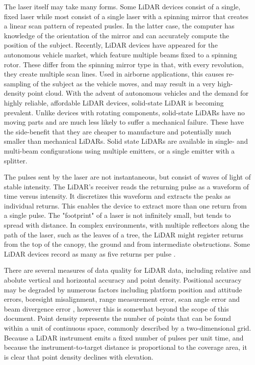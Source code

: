 \documentclass[10pt,a4paper]{report}
\begin{document}
The laser itself may take many forms. Some LiDAR devices consist of a single, fixed laser while most consist of a single laser with a spinning mirror that creates a linear scan pattern of repeated pusles. In the latter case, the computer has knowledge of the orientation of the mirror and can accurately compute the position of the subject. Recently, LiDAR devices have appeared for the autonomous vehicle market, which feature multiple beams fixed to a spinning rotor. These differ from the spinning mirror type in that, with every revolution, they create multiple scan lines. Used in airborne applications, this causes re-sampling of the subject as the vehicle moves, and may result in a very high-density point cloud. With the advent of autonomous vehicles and the demand for highly reliable, affordable LiDAR devices, solid-state LiDAR is becoming prevalent. Unlike devices with rotating components, solid-state LiDARs have no moving parts and are much less likely to suffer a mechanical failure. These have the side-benefit that they are cheaper to manufacture and potentially much smaller than mechanical LiDARs. Solid state LiDARs are available in single- and multi-beam configurations using multiple emitters, or a single emitter with a splitter.

The pulses sent by the laser are not instantaneous, but consist of waves of light of stable intensity. The LiDAR's receiver reads the returning pulse as a waveform of time versus intensity. It discretizes this waveform and extracts the peaks as individual returns. This enables the device to extract more than one return from a single pulse. The "footprint" of a laser is not infinitely small, but tends to spread with distance. In complex environments, with multiple reflectors along the path of the laser, such as the leaves of a tree, the LiDAR might register returns from the top of the canopy, the ground and from intermediate obstructions. Some LiDAR devices record as many as five returns per pulse \cite{Lillesand1999}.

There are several measures of data quality for LiDAR data, including relative and abolute vertical and horizontal accuracy and point density. Positional accuracy may be degraded by numerous factors including platform position and attitude errors, boresight misalignment, range measurement error, scan angle error and beam divergence error \cite{May2007}, however this is somewhat beyond the scope of this document. Point density represents the number of points that can be found within a unit of continuous space, commonly described by a two-dimensional grid. Because a LiDAR instrument emits a fixed number of pulses per unit time, and because the instrument-to-target distance is proportional to the coverage area, it is clear that point density declines with elevation. 
\end{document}
